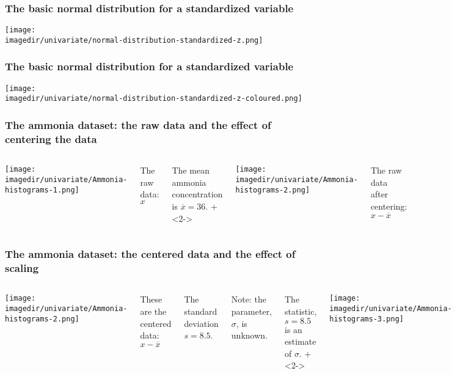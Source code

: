 \begin{frame}\frametitle{The basic normal distribution for a standardized variable}
	\begin{center}
		\texttt{[image: \\imagedir/univariate/normal-distribution-standardized-z.png]}
	\end{center}
\end{frame}

\begin{frame}\frametitle{The basic normal distribution for a standardized variable}
	\begin{center}
		\texttt{[image: \\imagedir/univariate/normal-distribution-standardized-z-coloured.png]}
	\end{center}
\end{frame}

\begin{frame}\frametitle{The ammonia dataset: the raw data and the effect of centering the data}
	\begin{columns}[T]
			\texttt{[image: \\imagedir/univariate/Ammonia-histograms-1.png]}
			
			The raw data: $x$
			
			The mean ammonia concentration is $ \overline{x}=36$.
			\onslide+<2->{
				\texttt{[image: \\imagedir/univariate/Ammonia-histograms-2.png]}
			
				The raw data after centering: $x - \overline{x}$
			}
	\end{columns}
\end{frame}

\begin{frame}\frametitle{The ammonia dataset: the centered data and the effect of scaling}
	\begin{columns}[T]
			\texttt{[image: \\imagedir/univariate/Ammonia-histograms-2.png]}
			
			These are the centered  data: $x - \overline{x}$
			
			The standard deviation $ s=8.5$.
			
			\vspace{12pt}
			Note: the parameter, $\sigma$, is unknown.
			
			The statistic, $s=8.5$ is an estimate of $\sigma$.
			\onslide+<2->{
				\texttt{[image: \\imagedir/univariate/Ammonia-histograms-3.png]}
			
				These are the data after scaling: $\dfrac{x - \overline{x}}{s}$
				
				\vspace{12pt}
				$\dfrac{x - \overline{x}}{s} = \dfrac{1}{s}\cdot\left(x - \overline{x}\right)$
			}
	\end{columns}
\end{frame}

